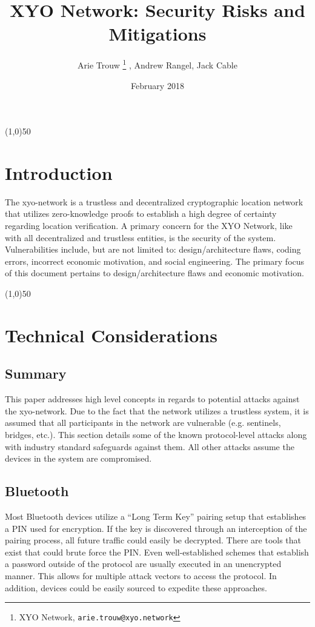 \documentclass{article}
\title {XYO Network: Security Risks and Mitigations}
\author{
    Arie Trouw \thanks{XYO Network, \texttt{arie.trouw@xyo.network}} , Andrew Rangel, Jack Cable
}
\date{February 2018}
\begin{document}
\pagecolor{lightred}

\maketitle

\begin{center}
\line(1,0){50}
\end{center}

\section{Introduction}
The \Gls{xyo-network} is a \gls{trustless} and decentralized cryptographic location network that utilizes zero-knowledge proofs to establish a high degree of certainty regarding location verification. A primary concern for the XYO Network, like with all decentralized and trustless entities, is the security of the system.  Vulnerabilities include, but are not limited to: design/architecture flaws, coding errors, incorrect economic motivation, and social engineering. The primary focus of this document pertains to design/architecture flaws and economic motivation.

\begin{center}
\line(1,0){50}
\end{center}

\section {Technical Considerations}
\subsection{Summary}
This paper addresses high level concepts in regards to potential attacks against the \Gls{xyo-network}. Due to the fact that the network utilizes a \gls{trustless} system, it is assumed that all participants in the network are vulnerable (e.g. \Glspl{sentinel}, \Glspl{bridge}, etc.). This section details some of the known protocol-level attacks along with industry standard safeguards against them. All other attacks assume the devices in the system are compromised.

\subsection{Bluetooth}
Most Bluetooth devices utilize a ``Long Term Key'' pairing setup that establishes a PIN used for encryption. If the key is discovered through an interception of the pairing process, all future traffic could easily be decrypted. There are tools that exist that could brute force the PIN. Even well-established schemes that establish a password outside of the protocol are usually executed in an unencrypted manner. This allows for multiple attack vectors to access the protocol. In addition, devices could be easily sourced to expedite these approaches.
\end{document}
